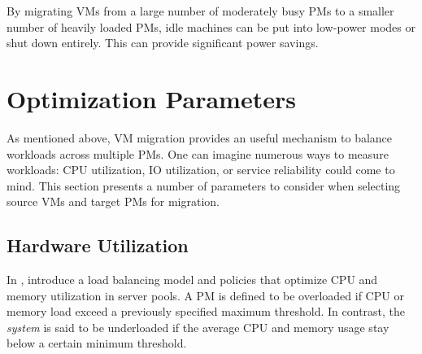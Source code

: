 \documentclass[12pt, a4paper]{scrartcl}
\begin{document}
By migrating \acp{VM} from a large number of moderately busy \acp{PM} to a smaller number of heavily loaded \acp{PM}, idle machines can be put into low-power modes or shut down entirely.
This can provide significant power savings.

\section{Optimization Parameters}\label{sec:optimization}
As mentioned above, \ac{VM} migration provides an useful mechanism to balance workloads across multiple \acp{PM}.
One can imagine numerous ways to measure workloads:
CPU utilization, IO utilization, or service reliability could come to mind.
This section presents a number of parameters to consider when selecting source \acp{VM} and target \acp{PM} for migration.

\subsection{Hardware Utilization}
In \cite{gmach_resource_2009}, \citeauthor{gmach_resource_2009} introduce a load balancing model and policies that optimize CPU and memory utilization in server pools.
A \ac{PM} is defined to be overloaded if CPU or memory load exceed a previously specified maximum threshold.
In contrast, the \emph{system} is said to be underloaded if the average CPU and memory usage stay below a certain minimum threshold.
\end{document}
